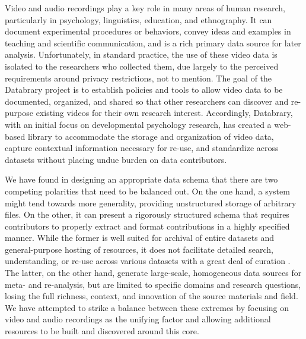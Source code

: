 \documentclass{sig-alternate}
\begin{document}

Video and audio recordings play a key role in many areas of human research, particularly in psychology, linguistics, education, and ethnography.
It can document experimental procedures or behaviors, convey ideas and examples in teaching and scientific communication, and is a rich primary data source for later analysis.
Unfortunately, in standard practice, the use of these video data is isolated to the researchers who collected them, due largely to the perceived requirements around privacy restrictions, not to mention.
The goal of the Databrary project is to establish policies and tools to allow video data to be documented, organized, and shared so that other researchers can discover and re-purpose existing videos for their own research interest.
Accordingly, Databrary, with an initial focus on developmental psychology research, has created a web-based library to accommodate the storage and organization of video data, capture contextual information necessary for re-use, and standardize across datasets without placing undue burden on data contributors.

We have found in designing an appropriate data schema that there are two competing polarities that need to be balanced out. On the one hand, a system might tend towards more generality, providing unstructured storage of arbitrary files. On the other, it can present a rigorously structured schema that requires contributors to properly extract and format contributions in a highly specified manner.
While the former is well suited for archival of entire datasets and general-purpose hosting of resources, it does not facilitate detailed search, understanding, or re-use across various datasets with a great deal of curation \cite{Peer_2012}.
The latter, on the other hand, generate large-scale, homogeneous data sources for meta- and re-analysis, but are limited to specific domains and research questions, losing the full richness, context, and innovation of the source materials and field.
We have attempted to strike a balance between these extremes by focusing on video and audio recordings as the unifying factor and allowing additional resources to be built and discovered around this core.
\end{document}
